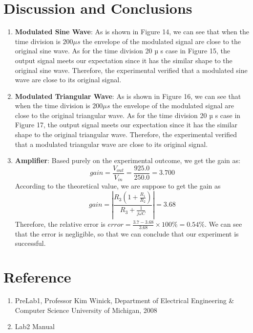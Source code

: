 \documentclass [utf8] {article}
\begin{document}
\section{Discussion and Conclusions}
{
	\begin{enumerate}
		\item \textbf{Modulated Sine Wave}: As is shown in Figure 14, we can see that when the time division is $200\mu s$ the envelope of the modulated signal are close to the original sine wave. As for the time division 20 µ s case in Figure 15, the output signal meets our expectation since it has the similar shape to the original sine wave. Therefore, the experimental verified that a modulated sine wave are close to its original signal.
		\item \textbf{Modulated Triangular Wave}: As is shown in Figure 16, we can see that when the time division is $200\mu s$ the envelope of the modulated signal are close to the original triangular wave. As for the time division 20 µ s case in Figure 17, the output signal meets our expectation since it has the similar shape to the original triangular wave. Therefore, the experimental verified that a modulated triangular wave are close to its original signal.
		\item \textbf{Amplifier}: Based purely on the experimental outcome, we get the gain as: $$gain = \frac{V_{out}}{V_{in}} = \frac{925.0}{250.0} = 3.700$$ According to the theoretical value, we are suppose to get the gain as $$gain = \left\lvert \frac{R_3(1+\frac{R_1}{R_2})}{R_3+\frac{1}{j\omega C}}\right\rvert = 3.68 $$
		Therefore, the relative error is $error = \frac{3.7-3.68}{3.68}\times 100\% = 0.54\%$. We can see that the error is negligible, so that we can conclude that our experiment is successful.
	\end{enumerate}
	
}

\section{Reference}
\begin{enumerate}
	\item PreLab1, Professor Kim Winick, Department of Electrical Engineering \& Computer Science University of Michigan, 2008
	\item Lab2 Manual
\end{enumerate}
\end{document}
